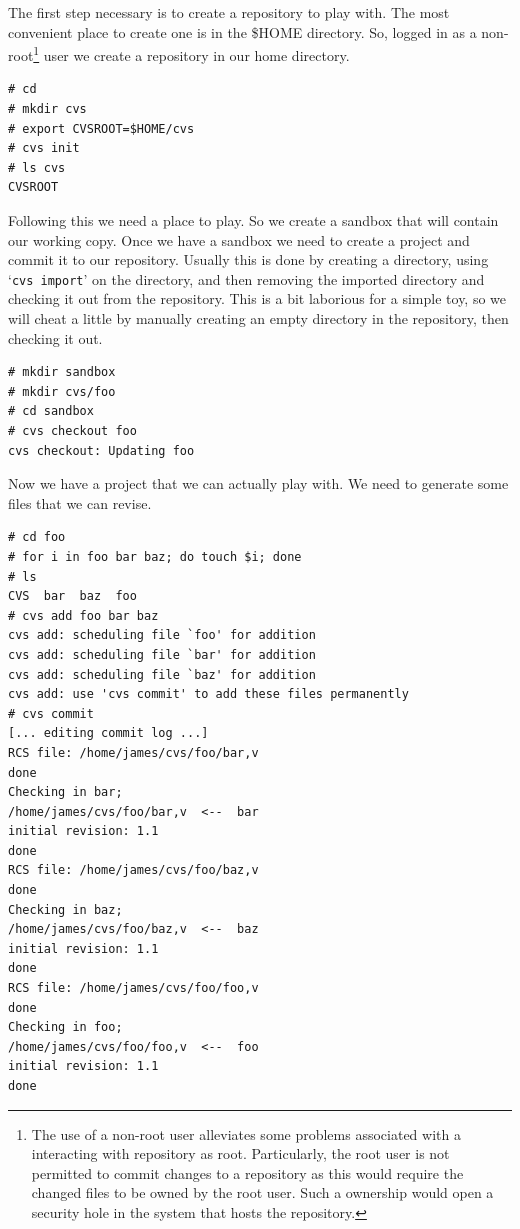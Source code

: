 \documentclass[12pt,letterpaper]{article}
\newcommand{\cmd}[1]{`\texttt{#1}'}
\begin{document}
The first step necessary is to create a repository to play with.  The most
convenient place to create one is in the \$HOME directory.  So, logged in as a
non-root\footnote{The use of a non-root user alleviates some problems
  associated with a interacting with repository as root.  Particularly, the
  root user is not permitted to commit changes to a repository as this would
  require the changed files to be owned by the root user.  Such a ownership
  would open a security hole in the system that hosts the repository.} user we
create a repository in our home directory.

\begin{Verbatim}
# cd
# mkdir cvs
# export CVSROOT=$HOME/cvs
# cvs init
# ls cvs
CVSROOT
\end{Verbatim}

Following this we need a place to play.  So we create a sandbox that will
contain our working copy.  Once we have a sandbox we need to create a project
and commit it to our repository.  Usually this is done by creating a
directory, using \cmd{cvs import} on the directory, and then removing the
imported directory and checking it out from the repository.  This is a bit
laborious for a simple toy, so we will cheat a little by manually creating an
empty directory in the repository, then checking it out.

\begin{Verbatim}
# mkdir sandbox
# mkdir cvs/foo
# cd sandbox
# cvs checkout foo
cvs checkout: Updating foo
\end{Verbatim}

Now we have a project that we can actually play with.  We need to generate
some files that we can revise.

\begin{Verbatim}
# cd foo
# for i in foo bar baz; do touch $i; done
# ls
CVS  bar  baz  foo
# cvs add foo bar baz
cvs add: scheduling file `foo' for addition
cvs add: scheduling file `bar' for addition
cvs add: scheduling file `baz' for addition
cvs add: use 'cvs commit' to add these files permanently
# cvs commit
[... editing commit log ...]
RCS file: /home/james/cvs/foo/bar,v
done
Checking in bar;
/home/james/cvs/foo/bar,v  <--  bar
initial revision: 1.1
done
RCS file: /home/james/cvs/foo/baz,v
done
Checking in baz;
/home/james/cvs/foo/baz,v  <--  baz
initial revision: 1.1
done
RCS file: /home/james/cvs/foo/foo,v
done
Checking in foo;
/home/james/cvs/foo/foo,v  <--  foo
initial revision: 1.1
done
\end{Verbatim}
\end{document}
